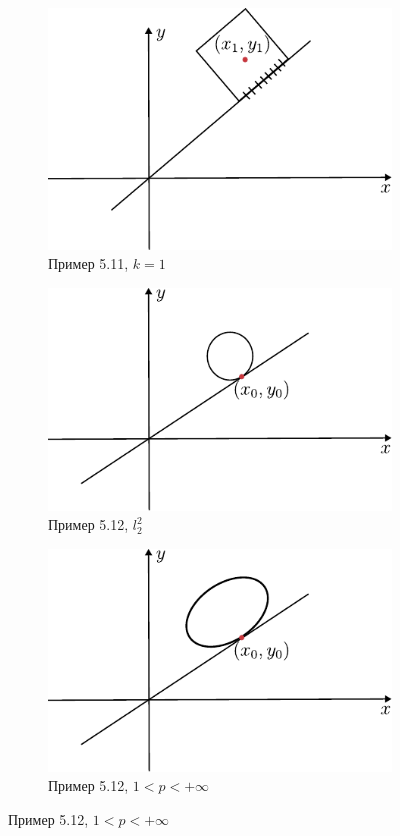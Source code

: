 \documentclass[document]{subfiles}
\begin{document}
\begin{figure}
\begin{subfigure}[h]{0.50\textwidth}
    \end{subfigure}
    \begin{subfigure}[h]{0.40\textwidth}
        \includegraphics*{images/chapter5/example2_2.pdf}\caption{Пример 5.11, $k = 1$}
    \end{subfigure}
    \begin{subfigure}[h]{0.50\textwidth}
        \includegraphics*{images/chapter5/example3_1.pdf}\caption{Пример 5.12, $l_2^2$}
    \end{subfigure}
    \begin{subfigure}[h]{0.40\textwidth}
        \includegraphics*{images/chapter5/example3_2.pdf}\caption{Пример 5.12, $1 < p < +\infty$}
    \end{subfigure}
\end{figure} 
\end{document}
